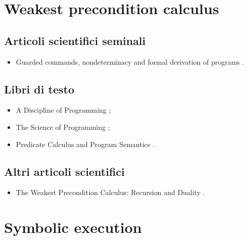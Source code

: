 \section*{Weakest precondition calculus}

\subsection*{Articoli scientifici seminali}
\begin{itemize}

\item Guarded commands, nondeterminacy and formal derivation of programs \cite{dijkstra1975wpc}.

\end{itemize}

\subsection*{Libri di testo}
\begin{itemize}

\item A Discipline of Programming \cite{dijkstra1976wpcbook};

\item The Science of Programming \cite{gries1987wpcbook};

\item Predicate Calculus and Program Semantics \cite{dijkstra1990wpcbook}.

\end{itemize}

\subsection*{Altri articoli scientifici}
\begin{itemize}

\item The Weakest Precondition Calculus: Recursion and Duality \cite{bonsangue1994wpc}.

\end{itemize}

\section*{Symbolic execution}

